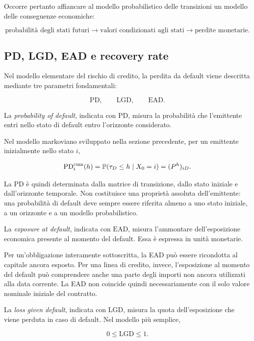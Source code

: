 Occorre pertanto affiancare al modello probabilistico delle
transizioni un modello delle conseguenze economiche:

\[
\text{probabilit\`{a} degli stati futuri}
\longrightarrow
\text{valori condizionati agli stati}
\longrightarrow
\text{perdite monetarie}.
\]

\subsection{PD, LGD, EAD e recovery rate}

\label{subsec:cap9-pd-lgd-ead}

Nel modello elementare del rischio di credito, la perdita da default
viene descritta mediante tre parametri fondamentali:

\[
\mathrm{PD},
\qquad
\mathrm{LGD},
\qquad
\mathrm{EAD}.
\]

La \emph{probability of default}, indicata con $\mathrm{PD}$, misura
la probabilit\`{a} che l'emittente entri nello stato di default entro
l'orizzonte considerato.

Nel modello markoviano sviluppato nella sezione precedente, per un
emittente inizialmente nello stato $i$,

\[
\mathrm{PD}_{i}^{\mathrm{cum}}(h)
=
\mathbb{P}(\tau_D\leq h\mid X_0=i)
=
(P^h)_{iD}.
\]

La PD \`{e} quindi determinata dalla matrice di transizione, dallo
stato iniziale e dall'orizzonte temporale. Non costituisce una
propriet\`{a} assoluta dell'emittente: una probabilit\`{a} di default
deve sempre essere riferita almeno a uno stato iniziale, a un
orizzonte e a un modello probabilistico.

La \emph{exposure at default}, indicata con $\mathrm{EAD}$, misura
l'ammontare dell'esposizione economica presente al momento del
default. Essa \`{e} espressa in unit\`{a} monetarie.

Per un'obbligazione interamente sottoscritta, la EAD pu\`{o} essere
ricondotta al capitale ancora esposto. Per una linea di credito, invece,
l'esposizione al momento del default pu\`{o} comprendere anche una
parte degli importi non ancora utilizzati alla data corrente. La EAD
non coincide quindi necessariamente con il solo valore nominale
iniziale del contratto.

La \emph{loss given default}, indicata con $\mathrm{LGD}$, misura la
quota dell'esposizione che viene perduta in caso di default. Nel
modello pi\`{u} semplice,

\[
0\leq \mathrm{LGD}\leq 1.
\]

